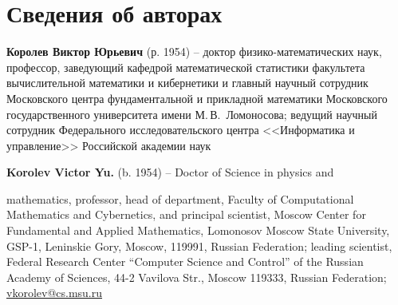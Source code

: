 \documentclass[14pt,a4paper]{extarticle}
\begin{document}
\section*{Сведения об авторах}



\small



{\bfseries Королев Виктор Юрьевич} (р. 1954) -- доктор физико-математических наук, профессор, заведующий кафедрой математической статистики факультета вычислительной математики и кибернетики и главный научный сотрудник Московского центра фундаментальной и прикладной математики Московского государственного университета имени М.\,В.~Ломоносова; ведущий научный сотрудник Федерального исследовательского центра <<Информатика и управление>> Российской академии наук





{\bfseries Korolev Victor Yu.} (b. 1954) -- Doctor of Science in physics and

mathematics, professor, head of department, Faculty of Computational Mathematics and Cybernetics, and principal scientist, Moscow Center for Fundamental and Applied Mathematics, Lomonosov Moscow State University, GSP-1, Leninskie Gory, Moscow, 119991, Russian Federation; leading scientist, Federal Research Center ``Computer Science and Control'' of the Russian Academy of Sciences, 44-2 Vavilova Str., Moscow 119333, Russian Federation; \url{vkorolev@cs.msu.ru}
\end{document}
